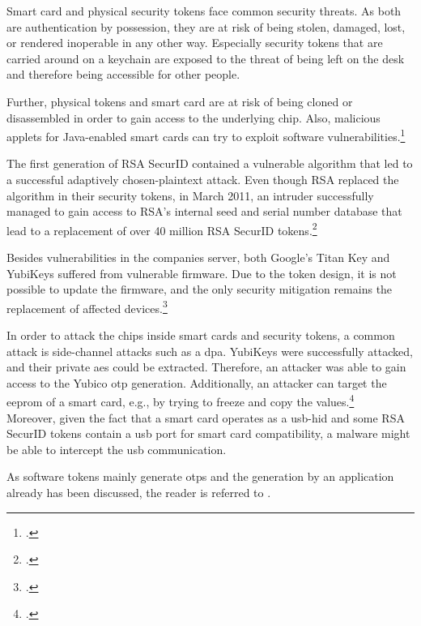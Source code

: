 Smart card and physical security tokens face common security threats. As both are authentication by possession, they are at risk of being stolen, damaged, lost, or rendered inoperable in any other way. Especially security tokens that are carried around on a keychain are exposed to the threat of being left on the desk and therefore being accessible for other people.

Further, physical tokens and smart card are at risk of being cloned or disassembled in order to gain access to the underlying chip. Also, malicious applets for Java-enabled smart cards can try to exploit software vulnerabilities.\footcites[See][14--16]{witteman2002advances}

The first generation of RSA SecurID contained a vulnerable algorithm that led to a successful adaptively chosen-plaintext attack. Even though RSA replaced the algorithm in their security tokens, in March 2011, an intruder successfully managed to gain access to RSA's internal seed and serial number database that lead to a replacement of over 40 million RSA SecurID tokens.\footcites[See][480]{eckert-it-sec-9}[See][369]{BIRYUKOV2005364}[See][8]{1324198}

Besides vulnerabilities in the companies server, both Google's Titan Key and YubiKeys suffered from vulnerable firmware. Due to the token design, it is not possible to update the firmware, and the only security mitigation remains the replacement of affected devices.\footcites[See][]{yubikey-heise}[See][]{titan-key}

In order to attack the chips inside smart cards and security tokens, a common attack is side-channel attacks such as a \gls{dpa}. YubiKeys were successfully attacked, and their private \gls{aes} could be extracted. Therefore, an attacker was able to gain access to the Yubico \gls{otp} generation. Additionally, an attacker can target the \gls{eeprom} of a smart card, e.g., by trying to freeze and copy the values.\footcites[See][210, 212, 219]{10.1007/978-3-642-41284-4_11}[See][502--503, 509]{anderson2008security}\\
Moreover, given the fact that a smart card operates as a \gls{usb}-\gls{hid} and some RSA SecurID tokens contain a \gls{usb} port for smart card compatibility, a malware might be able to intercept the \gls{usb} communication.

As software tokens mainly generate \glspl{otp} and the generation by an application already has been discussed, the reader is referred to .
 